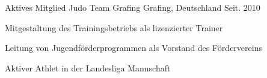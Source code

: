 \documentclass[11pt, a4paper]{awesome-cv}
\begin{document}
\begin{cventries}

  \cventry
  {Aktives Mitglied} %
  {Judo Team Grafing} %
  {Grafing, Deutschland} %
  {Seit. 2010} %
  {
    \begin{cvitems} %
      \item {Mitgestaltung des Trainingsbetriebs als lizenzierter Trainer}
      \item {Leitung von Jugendförderprogrammen als Vorstand des Fördervereins}
      \item {Aktiver Athlet in der Landesliga Mannschaft}
    \end{cvitems}
  }

\end{cventries}


\end{document}
